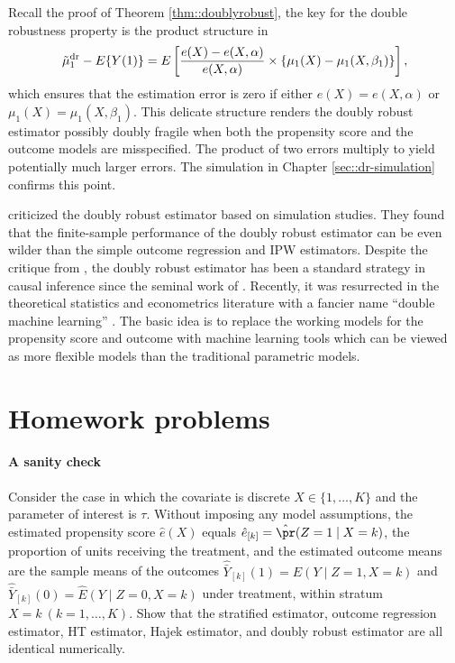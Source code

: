 Recall the proof of Theorem \ref{thm::doublyrobust}, the key for the double robustness property is the product structure in 
$$
\tilde{\mu}_1^\textup{dr} - E\{  Y(1) \} 
= E\left[   \frac{e(X) - e(X,\alpha) }{  e(X,\alpha) }  \times  \left\{  \mu_1(X) -  \mu_1(X, \beta_1)   \right\} \right] ,
$$
which ensures that the estimation error is zero if either $e(X) = e(X,\alpha) $ or $ \mu_1(X) =  \mu_1(X, \beta_1) $. This delicate structure renders the doubly robust estimator possibly doubly fragile when both the propensity score and the outcome models are misspecified. The product of two errors multiply to yield potentially much larger errors. 
The simulation in Chapter \ref{sec::dr-simulation} confirms this point. 


\citet{kang2007demystifying} criticized the doubly robust estimator based on simulation studies. They found that the finite-sample performance of the doubly robust estimator can be even wilder than the simple outcome regression and IPW estimators. 
Despite the critique from \citet{kang2007demystifying},  the doubly robust estimator has been a standard strategy in causal inference since the seminal work of \citet{scharfstein1999adjusting}. Recently, it was resurrected in the theoretical statistics and econometrics literature with a fancier name ``double machine learning'' \citep{chernozhukov2018double}. The basic idea is to replace the working models for the propensity score and outcome with machine learning tools which can be viewed as more flexible models than the traditional parametric models. 





\section{Homework problems}



 \paragraph{A sanity check}\label{hw::discreteX-obs}
Consider the case in which the covariate is discrete $X \in \{1, \ldots, K\}$ and the parameter of interest is $\tau$. Without imposing any model assumptions, the estimated propensity score $\hat{e}(X)$ equals $\hat{e}_{[k]} = \hat{\pr}(Z=1\mid X=k) $, the proportion of units receiving the treatment, and the estimated outcome means are the sample means of the outcomes $\hat{\bar{Y}}_{[k]}(1)  = \hat{E}(Y\mid Z=1, X=k) $ and $\hat{\bar{Y}}_{[k]}(0)  = \hat{E}(Y\mid Z=0, X=k) $ under treatment, within stratum $X=k\ (k=1, \ldots, K)$. Show that the stratified estimator, outcome regression estimator, HT estimator, Hajek estimator, and doubly robust estimator are all identical numerically. 
 


